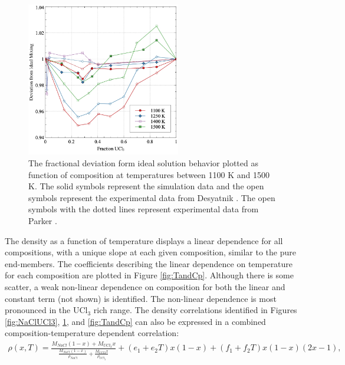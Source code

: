 \documentclass[preprint,3p,10pt,onecolumn,number,sort&compress]{elsarticle}
\begin{document}
{\begin{figure}[htb]
\centering
\includegraphics[width=0.6\textwidth]{fig7.jpg}
\caption{The fractional deviation form ideal solution behavior plotted as function of composition at temperatures between 1100 K and 1500 K. The solid symbols represent the simulation data and the open symbols represent the experimental data from Desyatnik \cite{Desyatnik}. The open symbols with the dotted lines represent experimental data from Parker \cite{Parker}.} 
\label{fig:ideal}
\end{figure}

The density as a function of temperature displays a linear dependence for all compositions, with a unique slope at each given composition, similar to the pure end-members. The coefficients describing the linear dependence on temperature for each composition are plotted in Figure \ref{fig:TandCp}. Although there is some scatter, a weak non-linear dependence on composition for both the linear and constant term (not shown) is identified. The non-linear dependence is most pronounced in the UCl$_3$ rich range. The density correlations identified in Figures \ref{fig:NaClUCl3}, \ref{fig:ideal}, and \ref{fig:TandCp} can also be expressed in a combined composition-temperature dependent correlation:
\begin{equation}
\begin{split}
\rho(x,T)=\frac{M_{NaCl}(1-x)+M_{UCl_3}x}{\frac{M_{NaCl}(1-x)}{\rho_{NaCl}}+\frac{M_{UCl3}x}{\rho_{UCl_3}}}+(e_1+e_2T)x(1-x)+(f_1+f_2T)x(1-x)(2x-1), 
\label{eq:LS}
\end{split}
\end{equation}

}
\end{document}

